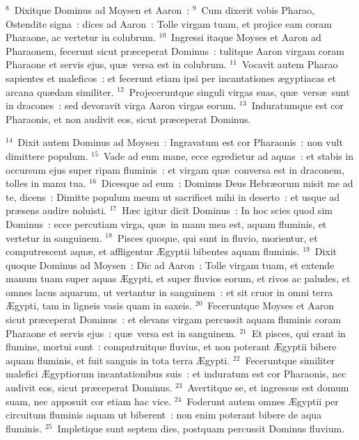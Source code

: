 ${}^{8}$~Dixitque Dominus ad Moysen et Aaron~:
${}^{9}$~Cum dixerit vobis Pharao, Ostendite signa~: dices ad Aaron~: Tolle virgam tuam, et projice eam coram Pharaone, ac vertetur in colubrum.
${}^{10}$~Ingressi itaque Moyses et Aaron ad Pharaonem, fecerunt sicut pr\ae ceperat Dominus~: tulitque Aaron virgam coram Pharaone et servis ejus, qu\ae\ versa est in colubrum.
${}^{11}$~Vocavit autem Pharao sapientes et maleficos~: et fecerunt etiam ipsi per incantationes \ae gyptiacas et arcana qu\ae dam similiter.
${}^{12}$~Projeceruntque singuli virgas suas, qu\ae\ vers\ae\ sunt in dracones~: sed devoravit virga Aaron virgas eorum.
${}^{13}$~Induratumque est cor Pharaonis, et non audivit eos, sicut pr\ae ceperat Dominus.


${}^{14}$~Dixit autem Dominus ad Moysen~: Ingravatum est cor Pharaonis~: non vult dimittere populum.
${}^{15}$~Vade ad eum mane, ecce egredietur ad aquas~: et stabis in occursum ejus super ripam fluminis~: et virgam qu\ae\ conversa est in draconem, tolles in manu tua.
${}^{16}$~Dicesque ad eum~: Dominus Deus Hebr\ae orum misit me ad te, dicens~: Dimitte populum meum ut sacrificet mihi in deserto~: et usque ad pr\ae sens audire noluisti.
${}^{17}$~H\ae c igitur dicit Dominus~: In hoc scies quod sim Dominus~: ecce percutiam virga, qu\ae\ in manu mea est, aquam fluminis, et vertetur in sanguinem.
${}^{18}$~Pisces quoque, qui sunt in fluvio, morientur, et computrescent aqu\ae , et affligentur \AE gyptii bibentes aquam fluminis.
${}^{19}$~Dixit quoque Dominus ad Moysen~: Dic ad Aaron~: Tolle virgam tuam, et extende manum tuam super aquas \AE gypti, et super fluvios eorum, et rivos ac paludes, et omnes lacus aquarum, ut vertantur in sanguinem~: et sit cruor in omni terra \AE gypti, tam in ligneis vasis quam in saxeis.
${}^{20}$~Feceruntque Moyses et Aaron sicut pr\ae ceperat Dominus~: et elevans virgam percussit aquam fluminis coram Pharaone et servis ejus~: qu\ae\ versa est in sanguinem.
${}^{21}$~Et pisces, qui erant in flumine, mortui sunt~: computruitque fluvius, et non poterant \AE gyptii bibere aquam fluminis, et fuit sanguis in tota terra \AE gypti.
${}^{22}$~Feceruntque similiter malefici \AE gyptiorum incantationibus suis~: et induratum est cor Pharaonis, nec audivit eos, sicut pr\ae ceperat Dominus.
${}^{23}$~Avertitque se, et ingressus est domum suam, nec apposuit cor etiam hac vice.
${}^{24}$~Foderunt autem omnes \AE gyptii per circuitum fluminis aquam ut biberent~: non enim poterant bibere de aqua fluminis.
${}^{25}$~Impletique sunt septem dies, postquam percussit Dominus fluvium.

